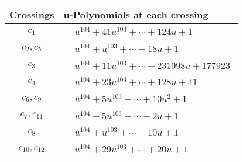 \documentclass[1p]{elsarticle_modified}
\theoremstyle{definition}
\begin{document}
\begin{tabular}{m{50pt}|m{274pt}}
Crossings & \hspace{64pt}u-Polynomials at each crossing \\
\hline $$\begin{aligned}c_{1}\end{aligned}$$&$\begin{aligned}
&u^{104}+41 u^{103}+\cdots+124 u+1
\end{aligned}$\\
\hline $$\begin{aligned}c_{2},c_{5}\end{aligned}$$&$\begin{aligned}
&u^{104}+u^{103}+\cdots-18 u+1
\end{aligned}$\\
\hline $$\begin{aligned}c_{3}\end{aligned}$$&$\begin{aligned}
&u^{104}+11 u^{103}+\cdots-231098 u+177923
\end{aligned}$\\
\hline $$\begin{aligned}c_{4}\end{aligned}$$&$\begin{aligned}
&u^{104}+23 u^{103}+\cdots+128 u+41
\end{aligned}$\\
\hline $$\begin{aligned}c_{6},c_{9}\end{aligned}$$&$\begin{aligned}
&u^{104}+5 u^{103}+\cdots+10 u^2+1
\end{aligned}$\\
\hline $$\begin{aligned}c_{7},c_{11}\end{aligned}$$&$\begin{aligned}
&u^{104}-5 u^{103}+\cdots-2 u+1
\end{aligned}$\\
\hline $$\begin{aligned}c_{8}\end{aligned}$$&$\begin{aligned}
&u^{104}+u^{103}+\cdots-10 u+1
\end{aligned}$\\
\hline $$\begin{aligned}c_{10},c_{12}\end{aligned}$$&$\begin{aligned}
&u^{104}+29 u^{103}+\cdots+20 u+1
\end{aligned}$\\
\hline
\end{tabular}\newpage\renewcommand{\arraystretch}{1}
\end{document}
